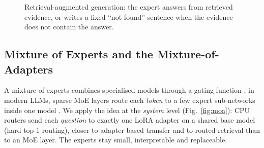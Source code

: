 \begin{figure}[!t]
\centering
{}
\caption{Retrieval-augmented generation: the expert answers from retrieved evidence, or writes a fixed ``not found'' sentence when the evidence does not contain the answer.}
\label{fig:rag}
\end{figure}

\subsection{Mixture of Experts and the Mixture-of-Adapters}
A mixture of experts combines specialised models through a gating function \cite{jacobs1991adaptive}; in modern LLMs, sparse MoE layers route each \emph{token} to a few expert sub-networks inside one model \cite{shazeer2017moe,fedus2022switch}. We apply the idea at the \emph{system} level (Fig.~\ref{fig:moa}): CPU routers send each \emph{question} to exactly one LoRA adapter on a shared base model (hard top-1 routing), closer to adapter-based transfer \cite{houlsby2019adapters} and to routed retrieval \cite{jeong2024adaptiverag,lee2025routerretriever} than to an MoE layer. The experts stay small, interpretable and replaceable.

